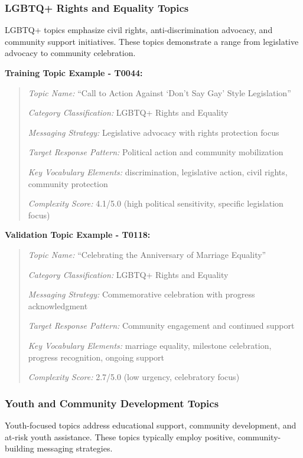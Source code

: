 \subsubsection{LGBTQ+ Rights and Equality Topics}

LGBTQ+ topics emphasize civil rights, anti-discrimination advocacy, and community support initiatives. These topics demonstrate a range from legislative advocacy to community celebration.

\textbf{Training Topic Example - T0044:}
\begin{quote}
\textit{Topic Name:} ``Call to Action Against `Don't Say Gay' Style Legislation''

\textit{Category Classification:} LGBTQ+ Rights and Equality

\textit{Messaging Strategy:} Legislative advocacy with rights protection focus

\textit{Target Response Pattern:} Political action and community mobilization

\textit{Key Vocabulary Elements:} discrimination, legislative action, civil rights, community protection

\textit{Complexity Score:} 4.1/5.0 (high political sensitivity, specific legislation focus)
\end{quote}

\textbf{Validation Topic Example - T0118:}
\begin{quote}
\textit{Topic Name:} ``Celebrating the Anniversary of Marriage Equality''

\textit{Category Classification:} LGBTQ+ Rights and Equality

\textit{Messaging Strategy:} Commemorative celebration with progress acknowledgment

\textit{Target Response Pattern:} Community engagement and continued support

\textit{Key Vocabulary Elements:} marriage equality, milestone celebration, progress recognition, ongoing support

\textit{Complexity Score:} 2.7/5.0 (low urgency, celebratory focus)
\end{quote}

\subsubsection{Youth and Community Development Topics}

Youth-focused topics address educational support, community development, and at-risk youth assistance. These topics typically employ positive, community-building messaging strategies.

